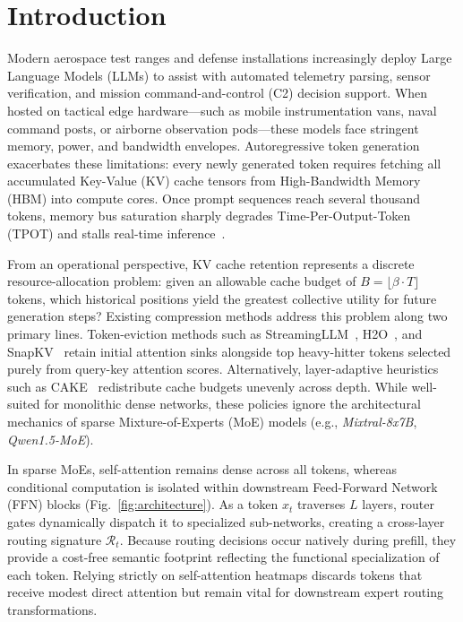 \documentclass[conference]{IEEEtran}
\begin{document}
\section{Introduction}
Modern aerospace test ranges and defense installations increasingly deploy Large Language Models (LLMs) to assist with automated telemetry parsing, sensor verification, and mission command-and-control (C2) decision support. When hosted on tactical edge hardware---such as mobile instrumentation vans, naval command posts, or airborne observation pods---these models face stringent memory, power, and bandwidth envelopes. Autoregressive token generation exacerbates these limitations: every newly generated token requires fetching all accumulated Key-Value (KV) cache tensors from High-Bandwidth Memory (HBM) into compute cores. Once prompt sequences reach several thousand tokens, memory bus saturation sharply degrades Time-Per-Output-Token (TPOT) and stalls real-time inference~\cite{dao2023flashattention2}.

From an operational perspective, KV cache retention represents a discrete resource-allocation problem: given an allowable cache budget of $B = \lfloor \beta \cdot T \rfloor$ tokens, which historical positions yield the greatest collective utility for future generation steps? Existing compression methods address this problem along two primary lines. Token-eviction methods such as StreamingLLM~\cite{xiao2023streamingllm}, H2O~\cite{zhang2023h2o}, and SnapKV~\cite{li2024snapkv} retain initial attention sinks alongside top heavy-hitter tokens selected purely from query-key attention scores. Alternatively, layer-adaptive heuristics such as CAKE~\cite{cake2025} redistribute cache budgets unevenly across depth. While well-suited for monolithic dense networks, these policies ignore the architectural mechanics of sparse Mixture-of-Experts (MoE) models (e.g., \emph{Mixtral-8x7B}, \emph{Qwen1.5-MoE}).

In sparse MoEs, self-attention remains dense across all tokens, whereas conditional computation is isolated within downstream Feed-Forward Network (FFN) blocks (Fig.~\ref{fig:architecture}). As a token $x_t$ traverses $L$ layers, router gates dynamically dispatch it to specialized sub-networks, creating a cross-layer routing signature $\mathcal{R}_t$. Because routing decisions occur natively during prefill, they provide a cost-free semantic footprint reflecting the functional specialization of each token. Relying strictly on self-attention heatmaps discards tokens that receive modest direct attention but remain vital for downstream expert routing transformations.
\end{document}
